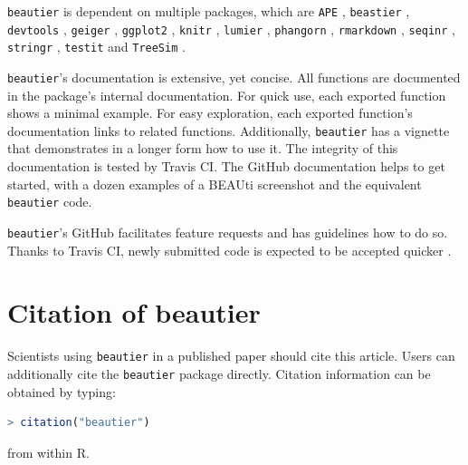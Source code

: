 \documentclass{article}
\begin{document}
\verb;beautier; is dependent on multiple packages, which are 
\verb;APE; \cite{APE}, 
\verb;beastier; \cite{beastier},
\verb;devtools; \cite{devtools},
\verb;geiger; \cite{GEIGER},
\verb;ggplot2; \cite{ggplot2},
\verb;knitr; \cite{knitr},
\verb;lumier; \cite{lumier},
\verb;phangorn; \cite{phangorn},
\verb;rmarkdown; \cite{rmarkdown},
\verb;seqinr; \cite{seqinr},
\verb;stringr; \cite{stringr},
\verb;testit; \cite{testit} and 
\verb;TreeSim; \cite{TreeSim}.

\verb;beautier;'s documentation is extensive, yet concise. All functions are documented
in the package's internal documentation. For quick use, each exported function shows a minimal example. 
For easy exploration, each exported function's documentation links to related functions.
Additionally, \verb;beautier; has a vignette that demonstrates in a longer form how
to use it. The integrity of this documentation is tested by Travis CI.
The GitHub documentation helps to get started, with a dozen examples 
of a BEAUti screenshot and the equivalent \verb;beautier; code.

\verb;beautier;'s GitHub facilitates feature requests and has guidelines how to do so.
Thanks to Travis CI, newly submitted code is expected to be accepted quicker \cite{vasilescu2015}.

\section{Citation of beautier}

Scientists using \verb;beautier; in a published paper should cite this
article. Users can additionally cite the \verb;beautier; package 
directly. Citation information can be obtained by typing:

\begin{lstlisting}[language=R]
> citation("beautier")
\end{lstlisting}

from within R.




\begin{thebibliography}{}

\end{thebibliography}
\end{document}
